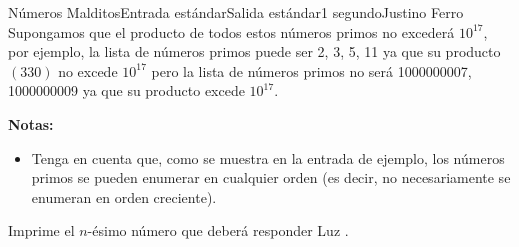 \begin{problem}{Números Malditos}{Entrada estándar}{Salida estándar}{1 segundo}{}{Justino Ferro}
Supongamos que el producto de todos estos números primos no excederá $10^{17}$, por ejemplo, la lista de números primos puede ser {2, 3, 5, 11} ya que su producto $(330)$ no excede $10^{17}$ pero la lista de números primos no será {1000000007, 1000000009} ya que su producto excede $10^{17}$.



\textbf{Notas:}
\begin{itemize}
    

\item  Tenga en cuenta que, como se muestra en la entrada de ejemplo, los números primos se pueden enumerar en cualquier orden (es decir, no necesariamente se enumeran en orden creciente).
\end{itemize}
\OutputFile

Imprime el $n$-ésimo número que deberá responder Luz  .

\Example

\begin{example}
\end{example}

\end{problem}

